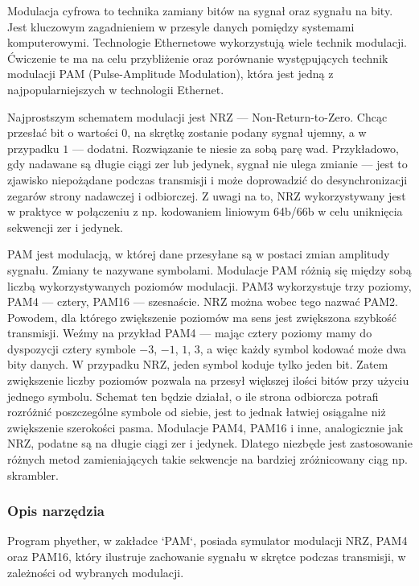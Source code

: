 Modulacja cyfrowa to technika zamiany bitów na sygnał oraz sygnału na bity. Jest kluczowym zagadnieniem w przesyle danych pomiędzy systemami
komputerowymi. Technologie Ethernetowe wykorzystują wiele technik modulacji. Ćwiczenie te ma na celu przybliżenie oraz porównanie
występujących technik modulacji PAM (Pulse-Amplitude Modulation), która jest jedną z najpopularniejszych w technologii Ethernet.

Najprostszym schematem modulacji jest NRZ --- Non-Return-to-Zero. Chcąc przesłać bit o wartości $0$, na skrętkę zostanie podany sygnał
ujemny, a w przypadku $1$ --- dodatni. Rozwiązanie te niesie za sobą parę wad. Przykładowo, gdy nadawane są długie ciągi zer lub jedynek, sygnał
nie ulega zmianie --- jest to zjawisko niepożądane podczas transmisji i może doprowadzić do desynchronizacji zegarów strony nadawczej i odbiorczej.
Z uwagi na to, NRZ wykorzystywany jest w praktyce w połączeniu z np. kodowaniem liniowym 64b/66b w celu uniknięcia sekwencji zer i jedynek.

PAM jest modulacją, w której dane przesyłane są w postaci zmian amplitudy sygnału. Zmiany te nazywane symbolami. Modulacje PAM różnią się między sobą
liczbą wykorzystywanych poziomów modulacji. PAM3 wykorzystuje trzy poziomy, PAM4 --- cztery, PAM16 --- szesnaście. NRZ można wobec tego nazwać PAM2.
Powodem, dla którego zwiększenie poziomów ma sens jest zwiększona szybkość transmisji. Weźmy na przykład PAM4 --- mając cztery poziomy mamy
do dyspozycji cztery symbole $-3$, $-1$, $1$, $3$, a więc każdy symbol kodować może dwa bity danych. W przypadku NRZ, jeden symbol koduje tylko jeden bit.
Zatem zwiększenie liczby poziomów pozwala na przesył większej ilości bitów przy użyciu jednego symbolu. Schemat ten będzie działał, o ile strona odbiorcza
potrafi rozróżnić poszczególne symbole od siebie, jest to jednak łatwiej osiągalne niż zwiększenie szerokości pasma.
Modulacje PAM4, PAM16 i inne, analogicznie jak NRZ, podatne są na długie ciągi zer i jedynek. Dlatego niezbęde jest zastosowanie różnych metod
zamieniających takie sekwencje na bardziej zróżnicowany ciąg np. skrambler.

\subsubsection{Opis narzędzia}

Program phyether, w zakładce `PAM`, posiada symulator modulacji NRZ, PAM4 oraz PAM16, który ilustruje zachowanie sygnału w skrętce podczas transmisji, w zależności
od wybranych modulacji.

